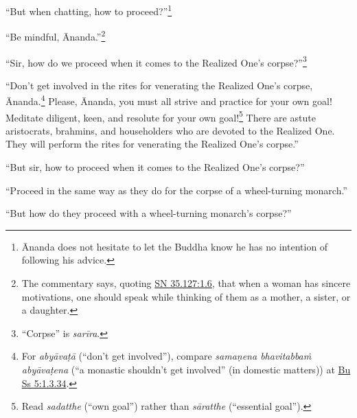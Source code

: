 \documentclass[12pt,openany]{book}%
\begin{document}
“But when chatting, how to proceed?”\footnote{Ānanda does not hesitate to let the Buddha know he has no intention of following his advice. } 

“Be mindful, Ānanda.”\footnote{The commentary says, quoting \href{https://suttacentral.net/sn35.127/en/sujato\#1.6}{SN 35.127:1.6}, that when a woman has sincere motivations, one should speak while thinking of them as a mother, a sister, or a daughter. } 

“Sir, how do we proceed when it comes to the Realized One’s corpse?”\footnote{“Corpse” is \textit{\textsanskrit{sarīra}}. } 

“Don’t get involved in the rites for venerating the Realized One’s corpse, Ānanda.\footnote{For \textit{\textsanskrit{abyāvaṭā}} (“don’t get involved”), compare \textit{\textsanskrit{samaṇena} \textsanskrit{bhavitabbaṁ} \textsanskrit{abyāvaṭena}} (“a monastic shouldn’t get involved” (in domestic matters)) at \href{https://suttacentral.net/pli-tv-bu-vb-ss5/en/sujato\#1.3.34}{Bu Ss 5:1.3.34}. } Please, Ānanda, you must all strive and practice for your own goal! Meditate diligent, keen, and resolute for your own goal!\footnote{Read \textit{sadatthe} (“own goal”) rather than \textit{\textsanskrit{sāratthe}} (“essential goal”). } There are astute aristocrats, brahmins, and householders who are devoted to the Realized One. They will perform the rites for venerating the Realized One’s corpse.” 

“But sir, how to proceed when it comes to the Realized One’s corpse?” 

“Proceed in the same way as they do for the corpse of a wheel-turning monarch.” 

“But how do they proceed with a wheel-turning monarch’s corpse?” 
\end{document}
